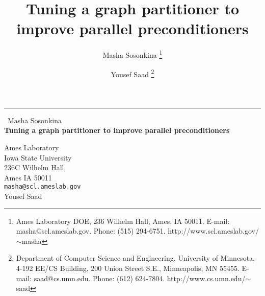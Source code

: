 \documentclass{report}
\begin{document}
\begin{center}
\rule{6in}{1pt} \
{\large Masha Sosonkina \\
{\bf Tuning a graph partitioner to improve parallel preconditioners}}

Ames Laboratory  \\ Iowa State University \\ 236C Wilhelm Hall \\ Ames IA 50011
\\
{\tt masha@scl.ameslab.gov}\\
Yousef Saad\end{center}

\title{Tuning a graph partitioner to
improve parallel preconditioners}
\author{
Masha Sosonkina
\thanks{ Ames Laboratory DOE, 236 Wilhelm Hall, Ames, IA 50011. E-mail:
masha@scl.ameslab.gov. Phone: (515) 294-6751.
http://www.scl.ameslab.gov/$\sim$masha}
\and
Yousef Saad \thanks{
Department of Computer Science and Engineering, University of
Minnesota,
4-192 EE/CS Building, 200 Union Street S.E., Minneapolis, MN 55455.
E-mail: saad@cs.umn.edu. Phone: (612) 624-7804.
http://www.cs.umn.edu/$\sim$saad}
}
\end{document}

